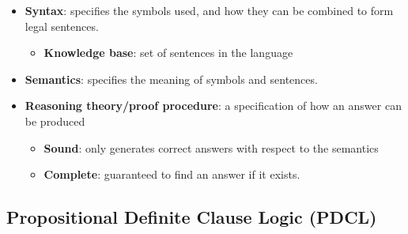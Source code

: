 \documentclass{article}
\begin{document}
\begin{itemize}
    \item \textbf{Syntax}: specifies the symbols used, and how they can be combined to form legal sentences.
        \begin{itemize}
            \item \textbf{Knowledge base}: set of sentences in the language
        \end{itemize}
    \item \textbf{Semantics}: specifies the meaning of symbols and sentences.
    \item \textbf{Reasoning theory/proof procedure}: a specification of how an answer can be produced
        \begin{itemize}
            \item \textbf{Sound}: only generates correct answers with respect to the semantics
            \item \textbf{Complete}: guaranteed to find an answer if it exists.
        \end{itemize}
\end{itemize}

\subsection{Propositional Definite Clause Logic (PDCL)}
\end{document}
